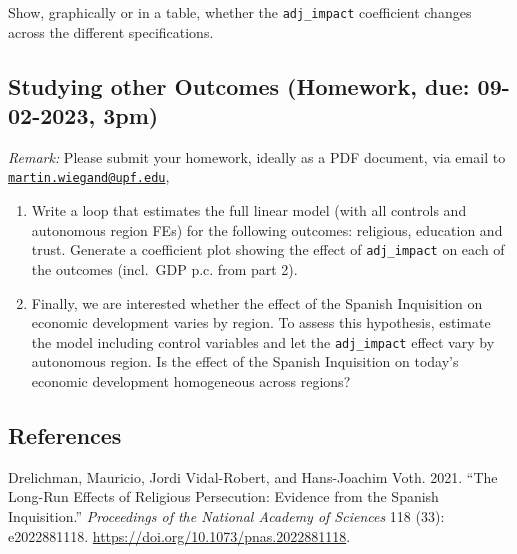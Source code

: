 \documentclass[
]{report}
\newlength{\cslhangindent}
\newlength{\cslentryspacingunit} %
\newenvironment{CSLReferences}[2] %
 {%
  \setlength{\parindent}{0pt}
  \ifodd #1
  \let\oldpar\par
  \def\par{\hangindent=\cslhangindent\oldpar}
  \fi
  \setlength{\parskip}{#2\cslentryspacingunit}
 }%
 {}
\begin{document}
Show, graphically or in a table, whether the \texttt{adj\_impact}
coefficient changes across the different specifications.

\subsection{Studying other Outcomes (Homework, due: 09-02-2023, 3pm)}

\emph{Remark:} Please submit your homework, ideally as a PDF document,
via email to
\href{mailto:martin.wiegand@upf.edu}{\nolinkurl{martin.wiegand@upf.edu}},

\begin{enumerate}
\def\labelenumi{\arabic{enumi}.}
\item
  Write a loop that estimates the full linear model (with all controls
  and autonomous region FEs) for the following outcomes: religious,
  education and trust. Generate a coefficient plot showing the effect of
  \texttt{adj\_impact} on each of the outcomes (incl.~GDP p.c. from part
  2).
\item
  Finally, we are interested whether the effect of the Spanish
  Inquisition on economic development varies by region. To assess this
  hypothesis, estimate the model including control variables and let the
  \texttt{adj\_impact} effect vary by autonomous region. Is the effect
  of the Spanish Inquisition on today's economic development homogeneous
  across regions?
\end{enumerate}

\pagebreak

\subsection{References}

\hypertarget{refs}{}
\begin{CSLReferences}{1}{0}
\leavevmode{}%
Drelichman, Mauricio, Jordi Vidal-Robert, and Hans-Joachim Voth. 2021.
{``The Long-Run Effects of Religious Persecution: Evidence from the
Spanish Inquisition.''} \emph{Proceedings of the National Academy of
Sciences} 118 (33): e2022881118.
\url{https://doi.org/10.1073/pnas.2022881118}.

\end{CSLReferences}
\end{document}
